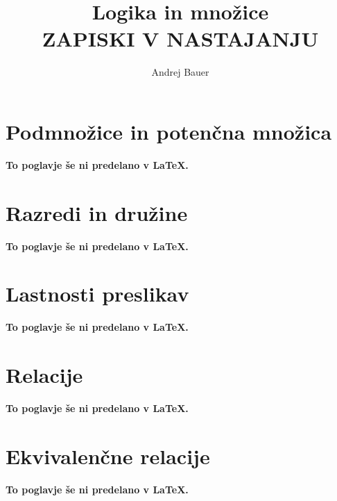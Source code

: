 \documentclass[11pt,a4paper]{book}
\author{Andrej Bauer}
\title{Logika in množice \\ ZAPISKI V NASTAJANJU}
\begin{document}
\maketitle

\cleardoublepage

\pagestyle{fancyplain}

{
\renewcommand{\markboth}[2]{}
\tableofcontents
}

\cleardoublepage














\chapter{Podmnožice in potenčna množica}
\textbf{To poglavje še ni predelano v {\LaTeX}.}
%

\chapter{Razredi in družine}
\textbf{To poglavje še ni predelano v {\LaTeX}.}
%

\chapter{Lastnosti preslikav}
\textbf{To poglavje še ni predelano v {\LaTeX}.}
%

\chapter{Relacije}
\textbf{To poglavje še ni predelano v {\LaTeX}.}
%

\chapter{Ekvivalenčne relacije}
\textbf{To poglavje še ni predelano v {\LaTeX}.}
%
\end{document}
